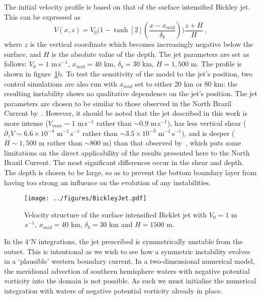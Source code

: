The initial velocity profile is based on that of the surface intensified Bickley jet. This can be expressed as
\begin{equation}
    V(x, z) = V_0 \Bigg( 1 - \tanh[2](\frac{x - x_{mid}}{\delta_b})\Bigg) \frac{z + H}{H} \, ,
\end{equation}
where $z$ is the vertical coordinate which becomes increasingly negative below the surface, and $H$ is the absolute value of the depth. The jet parameters are set as follows: $V_0 = 1$ m\,s$^{-1}$, $x_{mid} = 40$ km, $\delta_b = 30$ km, $H = 1,500$ m. The profile is shown in figure~\ref{fig:BickleyJet}b. To test the sensitivity of the model to the jet's position, two control simulations are also run with $x_{mid}$ set to either 20 km or 80 km: the resulting instability shows no qualitative dependence on the jet's position. The jet parameters are chosen to be similar to those observed in the North Brazil Current by~\citet{Johns1998}. However, it should be noted that the jet described in this work is more intense ($V_{max} \sim 1$ m\,s$^{-1}$ rather than $\sim 0.9$ m\,s$^{-1}$), has less vertical shear ($\partial_z V \sim 6.6\times 10^{-4}$ m$^{-1}$\,s$^{-1}$ rather than $\sim 3.5 \times 10^{-3}$ m$^{-1}$\,s$^{-1}$), and is deeper ($H\sim 1,500$ m rather than $\sim 800$ m) than that observed by~\citet{Johns1998}, which puts some limitations on the direct applicability of the results presented here to the North Brazil Current. The most significant differences occur in the shear and depth. The depth is chosen to be large, so as to prevent the bottom boundary layer from having too strong an influence on the evolution of any instabilities.

\begin{figure} 
    \centering
    \texttt{[image: ../figures/BickleyJet.pdf]}
    \caption{Velocity structure of the surface intensified Bicklet jet with $V_0 = 1$ m$\,$s$^{-1}$,  $x_{mid} = 40$ km, $\delta_b = 30$ km and $H = 1500$ m.}
    \label{fig:BickleyJet}
\end{figure}

In the 4$^\circ$N integrations, the jet prescribed is symmetrically unstable from the outset. This is intentional as we wish to see how a symmetric instability evolves in a `plausible' western boundary current. In a two-dimensional numerical model, the meridional advection of southern hemisphere waters with negative potential vorticity into the domain is not possible. As such we must initialise the numerical integration with waters of negative potential vorticity already in place.

